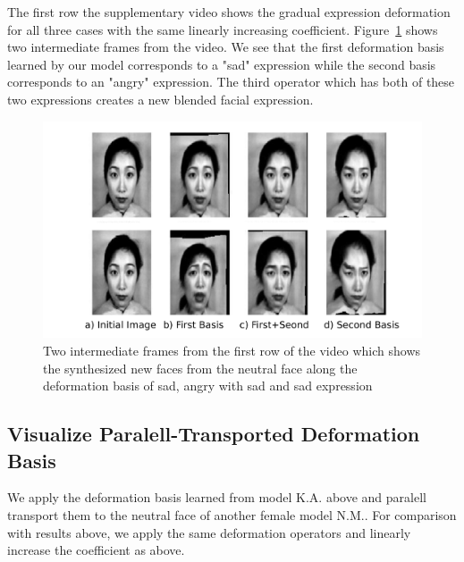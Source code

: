 \documentclass[runningheads]{llncs}
\begin{document}
The first row the supplementary video shows the gradual expression deformation for all three cases with the same linearly increasing coefficient. Figure~\ref{fig:v1} shows two intermediate frames from the video.
We see that the first deformation basis learned by our model corresponds to a "sad" expression while the second basis corresponds to an "angry" expression. The third operator which has both of these two expressions creates a new blended facial expression. 
\begin{figure}[t]
    \centering
    \includegraphics[height=0.6\columnwidth]{figs/V1.pdf}
    \caption{Two intermediate frames from the first row of the video which shows the synthesized new faces from the neutral face along the deformation basis of sad, angry with sad and sad expression}
    \label{fig:v1}
\end{figure}
\subsection{Visualize Paralell-Transported Deformation Basis}
We apply the deformation basis learned from model K.A. above and paralell transport them to the neutral face of another female model N.M.. For comparison with results above, we apply the same deformation operators and linearly increase the coefficient as above.
\end{document}
